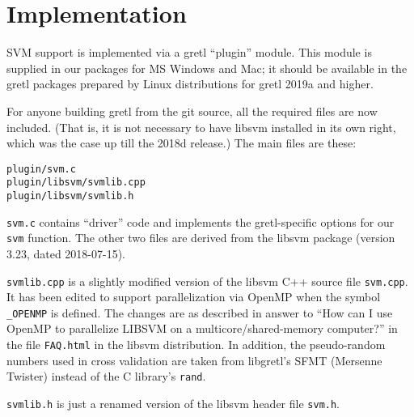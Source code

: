\documentclass{article}
\begin{document}
\section{Implementation}
\label{sec:implement}

SVM support is implemented via a gretl ``plugin'' module. This module
is supplied in our packages for MS Windows and Mac; it should be
available in the gretl packages prepared by Linux distributions for
gretl 2019a and higher.

For anyone building gretl from the git source, all the required files
are now included. (That is, it is not necessary to have
\textsf{libsvm} installed in its own right, which was the case up till
the 2018d release.) The main files are these:
\begin{verbatim}
plugin/svm.c
plugin/libsvm/svmlib.cpp
plugin/libsvm/svmlib.h
\end{verbatim}

\texttt{svm.c} contains ``driver'' code and implements the
gretl-specific options for our \texttt{svm} function. The other two
files are derived from the \textsf{libsvm} package (version 3.23,
dated 2018-07-15).

\texttt{svmlib.cpp} is a slightly modified version of the
\textsf{libsvm} C++ source file \texttt{svm.cpp}. It has been edited
to support parallelization via \textsf{OpenMP} when the symbol
\texttt{\_OPENMP} is defined. The changes are as described in answer
to ``How can I use OpenMP to parallelize LIBSVM on a
multicore/shared-memory computer?'' in the file \texttt{FAQ.html} in
the \textsf{libsvm} distribution. In addition, the pseudo-random
numbers used in cross validation are taken from libgretl's
\textsf{SFMT} (Mersenne Twister) instead of the C library's
\texttt{rand}.

\texttt{svmlib.h} is just a renamed version of the \textsf{libsvm}
header file \texttt{svm.h}.



\end{document}
